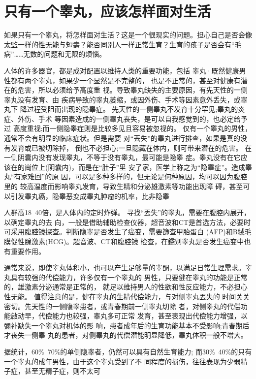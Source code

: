 \documentclass[12pt,UTF8]{ctexbook}
\begin{document}
\section{只有一个睾丸，应该怎样面对生活}

如果只有一个睾丸，将怎样面对生活？这是一个很现实的问题。担心自己是否会像太監一样的性无能与短壽？能否同别人一样正常生育？生育的孩子是否会有“毛病”……无数的问题和无限的烦惱。

人体的许多器官，都是成对配置以维持人类的重要功能，包括
睾丸·既然健康男性都有两个睾丸，如果少一个显然是不完整的，
也是不正常的，甚至对健康有潜在的危害，所以必须给予高度重
视。导致睾丸缺失的主要原因，有先天性的一侧睾丸没有发育、由
疾病导致的睾丸萎缩，或因外伤、手术等因素意外丢失，或睾丸下
降过程受阻而出现的隐睾症。
先天性的一侧睾丸不发育十分罕见;睾丸的炎症、外伤、手术
等因素造成的一侧睾丸丧失，是可以自我感觉到的，也必定给予过
高度重视;而一侧隐睾症则是比较多见且容易被忽视的。
仅有一个睾丸的男性，通常不会有明显的临床症状。但是需要
对“丟失”的睾丸进行排查，如果是真的没有发育或已被切除掉，
倒也不必担心;一旦隐藏在体内，则可带来潜在的危害。
在一侧阴囊内没有发现睾丸，不等于没有睾丸，最可能是隐睾
症。睾丸没有在它应该在的崗位上(阴囊内)，而是在“肚子”里
安了家，医学上称之为“隐睾症”。造成睾丸“有家难回”的原
因，可以是多种多样的，但无论是何种原因，均可以因为腹腔里的
较高温度而影响睾丸发育，导致生精和分泌雄激素等功能出现障
碍，甚至可以引发睾丸癌，隐睾恶变成睾丸肿瘤的机率，比非隐睾

人群高18~40倍，是人体内的定时炸弹。
寻找“丟失”的睾丸，需要在腹腔内展开，以确定睾丸的去
向，一般是借助辅助检查仪器，超音波和CT是首选方法，必要时
可采用腹腔镜探查。判断隐睾是否发生了癌变，需要篩查甲胎蛋白
(AFP)和B絨毛膜促性腺激素(HCG)。超音波、CT和腹腔镜
检查，在鑑别睾丸是否发生癌变中也有重要作用。

通常来说，即使睾丸体积小，也可以产生足够量的睾酮，以满足日常生理需求。睾丸具有较强的代偿能力，许多仅有一个睾丸的
男性，只要健在睾丸的功能是正常的，雄激素分泌通常是正常的，
就足以维持男人的性欲和性反应能力，不必担心性无能。
值得注意的是，健在睾丸的生精代偿能力，与对侧睾丸丟失的
时间关关密切。先天性的一侧隐睾患者，或青春期前一侧睾丸切除
者，对侧睾丸的代偿功能啟动早，代偿能力也较强，睾丸多可正常
发育，甚至表现出代偿能力增强，以彌补缺失一个睾丸对机体的影
响，患者成年后的生育功能基本不受影响;青春期后才丧失一侧睾
丸的患者，对侧睾丸的代偿潜能明显降低，睾丸体积一般不增大。

据统计，60\%~70\%的单侧隐睾者，仍然可以具有自然生育能力;
而30\%~40\%的只有一个睾丸的成年男性，由于这个睾丸受到了不
同程度的损伤，往往表现为少弱精子症，甚至无精子症，则不太可
\end{document}
